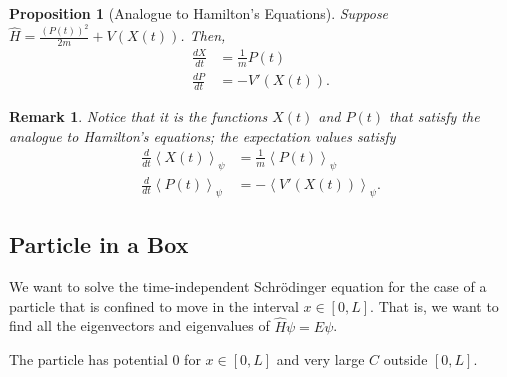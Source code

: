 \documentclass[10pt]{extarticle}
\newtheorem*{remark}{Remark}
\theoremstyle{plain}
\newtheorem*{proposition}{Proposition}%
\theoremstyle{definition}
\theoremstyle{remark}
\renewcommand{\newline}{\hfill\break}
\begin{document}
  \begin{proposition}[Analogue to Hamilton's Equations]
    Suppose $\hat{H} = \frac{\left(P(t)\right)^2}{2m} + V\left(X(t)\right)$. Then,
    \begin{align*}
      \frac{dX}{dt} &= \frac{1}{m}P(t)\\
      \frac{dP}{dt} &= -V'(X(t)).
    \end{align*}
  \end{proposition}
  \begin{remark}
    Notice that it is the functions $X(t)$ and $P(t)$ that satisfy the analogue to Hamilton's equations; the expectation values satisfy
    \begin{align*}
      \frac{d}{dt}\left\langle X(t)\right\rangle_{\psi} &= \frac{1}{m}\left\langle P(t)\right\rangle_{\psi}\\
      \frac{d}{dt}\left\langle P(t)\right\rangle_{\psi} &= -\left\langle V'(X(t))\right\rangle_{\psi}.
    \end{align*}
  \end{remark}
  \subsection{Particle in a Box}%
  We want to solve the time-independent Schrödinger equation for the case of a particle that is confined to move in the interval $x\in [0,L]$. That is, we want to find all the eigenvectors and eigenvalues of $\hat{H}\psi = E\psi$. \newline

  The particle has potential $0$ for $x\in [0,L]$ and very large $C$ outside $[0,L]$.
\end{document}
